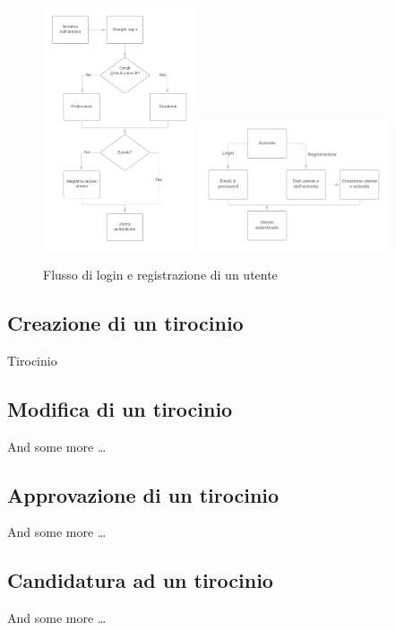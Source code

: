 \begin{figure}[H] 
	\centering    
	\includegraphics[width=0.4\textwidth]{Chapter2/Figs/univelogin}
	\includegraphics[width=0.5\textwidth]{Chapter2/Figs/companylogin}
	\caption[Flusso di login e registrazione di un utente]{Flusso di login e registrazione di un utente}
	\label{fig:univelogin}
\end{figure}

\subsection{Creazione di un tirocinio}

Tirocinio
\subsection{Modifica di un tirocinio}
And some more \dots

\subsection{Approvazione di un tirocinio}
And some more \dots

\subsection{Candidatura ad un tirocinio}
And some more \dots

